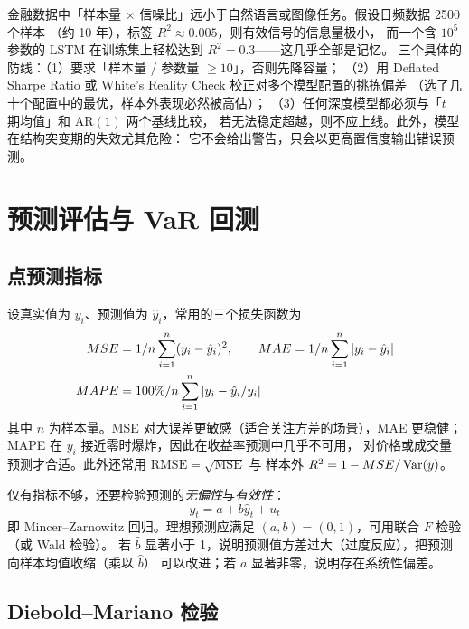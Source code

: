 \begin{warningbox}
金融数据中「样本量 $\times$ 信噪比」远小于自然语言或图像任务。假设日频数据 2500 个样本
（约 10 年），标签 $R^2\approx 0.005$，则有效信号的信息量极小，
而一个含 $10^5$ 参数的 LSTM 在训练集上轻松达到 $R^2=0.3$——这几乎全部是记忆。
三个具体的防线：（1）要求「样本量 / 参数量 $\ge 10$」，否则先降容量；
（2）用 Deflated Sharpe Ratio 或 White's Reality Check 校正对多个模型配置的挑拣偏差
（选了几十个配置中的最优，样本外表现必然被高估）；
（3）任何深度模型都必须与「$t$ 期均值」和 $\mathrm{AR}(1)$ 两个基线比较，
若无法稳定超越，则不应上线。此外，模型在结构突变期的失效尤其危险：
它不会给出警告，只会以更高置信度输出错误预测。
\end{warningbox}

\section{预测评估与 VaR 回测}

\subsection{点预测指标}

设真实值为 $y_i$、预测值为 $\hat y_i$，常用的三个损失函数为
\begin{align}
  MSE&=1/n\sum_{i=1}^{n}(y_i-\hat y_i)^{2},\qquad
  MAE=1/n\sum_{i=1}^{n}\left\lvert y_i-\hat y_i \right\rvert\label{eq:09-mse-mae}\\
  MAPE&=100\%/n\sum_{i=1}^{n}\left\lvert y_i-\hat y_i/y_i \right\rvert\label{eq:09-mape}
\end{align}
其中 $n$ 为样本量。MSE 对大误差更敏感（适合关注方差的场景），MAE 更稳健；
MAPE 在 $y_i$ 接近零时爆炸，因此在收益率预测中几乎不可用，
对价格或成交量预测才合适。此外还常用 $\mathrm{RMSE}=\sqrt{\mathrm{MSE}}$ 与
样本外 $R^2=1-MSE/\operatorname{Var}(y)$。

仅有指标不够，还要检验预测的\emph{无偏性}与\emph{有效性}：
\begin{equation}\label{eq:09-mz}
  y_t=a+b\hat y_t+u_t
\end{equation}
即 Mincer--Zarnowitz 回归。理想预测应满足 $(a,b)=(0,1)$，可用联合 $F$ 检验（或 Wald 检验）。
若 $\hat b$ 显著小于 1，说明预测值方差过大（过度反应），把预测向样本均值收缩（乘以 $\hat b$）
可以改进；若 $a$ 显著非零，说明存在系统性偏差。

\subsection{Diebold--Mariano 检验}

